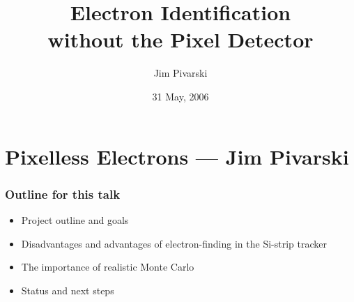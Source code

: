 \documentclass[12pt,compress]{beamer}
\title{Electron Identification \\ without the Pixel Detector}
\author{Jim Pivarski}
\institute{Cornell University}
\date{31 May, 2006}
\begin{document}
\addtocounter{page}{-1}
\frame{\titlepage}
\section*{Pixelless Electrons --- Jim Pivarski}

\begin{frame}
\frametitle{Outline for this talk}

\begin{itemize}\setlength{\itemsep}{0.75 cm}
\item Project outline and goals
\item Disadvantages and advantages of electron-finding in the Si-strip tracker
\item The importance of realistic Monte Carlo
\item Status and next steps
\end{itemize}

\end{frame}
\end{document}
